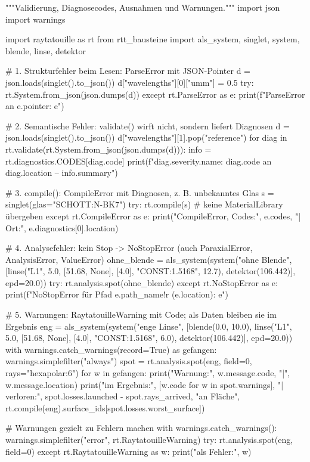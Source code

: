 \documentclass[11pt,a4paper,openany]{book}
\DeclareRobustCommand{\code}[1]{\texttt{\directlua{rttcode("\luaescapestring{\detokenize{#1}}")}}}
\begin{document}
\begin{pycode}[title={\code{ex05_fehler.py}}]
"""Validierung, Diagnosecodes, Ausnahmen und Warnungen."""
import json
import warnings

import raytatouille as rt
from rtt_bausteine import als_system, singlet, system, blende, linse, detektor

# 1. Strukturfehler beim Lesen: ParseError mit JSON-Pointer
d = json.loads(singlet().to_json())
d["wavelengths"][0]["umm"] = 0.5
try:
    rt.System.from_json(json.dumps(d))
except rt.ParseError as e:
    print(f"ParseError an {e.pointer}: {e}")

# 2. Semantische Fehler: validate() wirft nicht, sondern liefert Diagnosen
d = json.loads(singlet().to_json())
d["wavelengths"][1].pop("reference")
for diag in rt.validate(rt.System.from_json(json.dumps(d))):
    info = rt.diagnostics.CODES[diag.code]
    print(f"{diag.severity.name}: {diag.code} an {diag.location} – {info.summary}")

# 3. compile(): CompileError mit Diagnosen, z. B. unbekanntes Glas
s = singlet(glas="SCHOTT:N-BK7")
try:
    rt.compile(s)                               # keine MaterialLibrary übergeben
except rt.CompileError as e:
    print("CompileError, Codes:", e.codes, "| Ort:", e.diagnostics[0].location)

# 4. Analysefehler: kein Stop -> NoStopError (auch ParaxialError, AnalysisError, ValueError)
ohne_blende = als_system(system("ohne Blende",
                                [linse("L1", 5.0, [51.68, None], [4.0], "CONST:1.5168", 12.7),
                                 detektor(106.442)], epd=20.0))
try:
    rt.analysis.spot(ohne_blende)
except rt.NoStopError as e:
    print(f"NoStopError für Pfad {e.path_name!r} ({e.location}): {e}")

# 5. Warnungen: RaytatouilleWarning mit Code; als Daten bleiben sie im Ergebnis
eng = als_system(system("enge Linse", [blende(0.0, 10.0),
                                       linse("L1", 5.0, [51.68, None], [4.0], "CONST:1.5168", 6.0),
                                       detektor(106.442)], epd=20.0))
with warnings.catch_warnings(record=True) as gefangen:
    warnings.simplefilter("always")
    spot = rt.analysis.spot(eng, field=0, rays="hexapolar:6")
for w in gefangen:
    print("Warnung:", w.message.code, "|", w.message.location)
print("im Ergebnis:", [w.code for w in spot.warnings], "| verloren:", spot.losses.launched - spot.rays_arrived,
      "an Fläche", rt.compile(eng).surface_ids[spot.losses.worst_surface])

# Warnungen gezielt zu Fehlern machen
with warnings.catch_warnings():
    warnings.simplefilter("error", rt.RaytatouilleWarning)
    try:
        rt.analysis.spot(eng, field=0)
    except rt.RaytatouilleWarning as w:
        print("als Fehler:", w)
\end{pycode}
\end{document}
